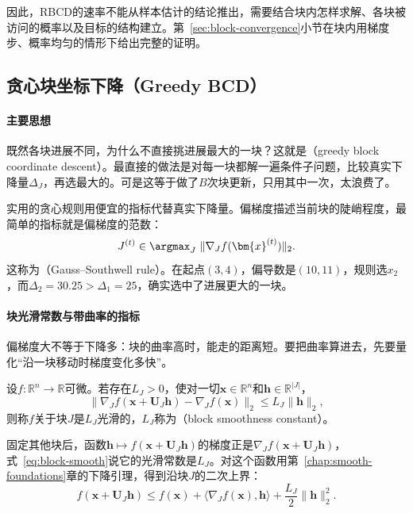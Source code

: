因此，RBCD的速率不能从样本估计的结论推出，需要结合块内怎样求解、各块被访问的概率以及目标的结构建立。第~\ref{sec:block-convergence}小节在块内用梯度步、概率均匀的情形下给出完整的证明。

\subsection{贪心块坐标下降（Greedy BCD）}
\label{sec:block-greedy}

\paragraph{主要思想}
既然各块进展不同，为什么不直接挑进展最大的一块？这就是（greedy block coordinate descent）。最直接的做法是对每一块都解一遍条件子问题，比较真实下降量$\Delta_J$，再选最大的。可是这等于做了$B$次块更新，只用其中一次，太浪费了。

实用的贪心规则用便宜的指标代替真实下降量。偏梯度描述当前块的陡峭程度，最简单的指标就是偏梯度的范数：
\begin{equation}
 J^{(t)}\in\argmax_{J}\ \lVert\nabla_Jf(\bm{x}^{(t)})\rVert_2 .
 \label{eq:block-gauss-southwell}
\end{equation}
这称为（Gauss--Southwell rule）。在起点$(3,4)$，偏导数是$(10,11)$，规则选$x_2$，而$\Delta_2=30.25>\Delta_1=25$，确实选中了进展更大的一块。

\paragraph{块光滑常数与带曲率的指标}
偏梯度大不等于下降多：块的曲率高时，能走的距离短。要把曲率算进去，先要量化“沿一块移动时梯度变化多快”。

\begin{definition}[块光滑常数]
\label{def:block-smooth}
设$f:\mathbb{R}^n\to\mathbb{R}$可微。若存在$L_J>0$，使对一切$\bm{x}\in\mathbb{R}^n$和$\bm{h}\in\mathbb{R}^{\lvert J\rvert}$，
\begin{equation}
 \lVert\nabla_Jf(\bm{x}+\bm{U}_J\bm{h})-\nabla_Jf(\bm{x})\rVert_2\leq L_J\lVert\bm{h}\rVert_2 ,
 \label{eq:block-smooth}
\end{equation}
则称$f$关于块$J$是$L_J$光滑的，$L_J$称为（block smoothness constant）。
\end{definition}

固定其他块后，函数$\bm{h}\mapsto f(\bm{x}+\bm{U}_J\bm{h})$的梯度正是$\nabla_Jf(\bm{x}+\bm{U}_J\bm{h})$，式~\eqref{eq:block-smooth}说它的光滑常数是$L_J$。对这个函数用第~\ref{chap:smooth-foundations}章的下降引理，得到沿块$J$的二次上界：
\begin{equation}
 f(\bm{x}+\bm{U}_J\bm{h})\leq f(\bm{x})+\langle\nabla_Jf(\bm{x}),\bm{h}\rangle+\frac{L_J}{2}\lVert\bm{h}\rVert_2^2 .
 \label{eq:block-quadratic-upper}
\end{equation}

